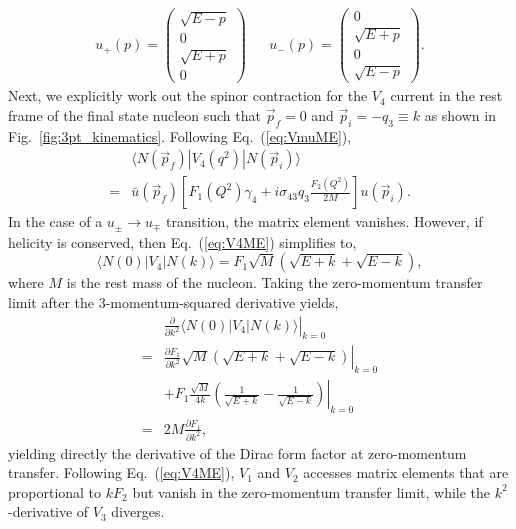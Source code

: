 \documentclass[prd,aps,twocolumn,superscriptaddress,tightenlines,nofootinbib,floatfix,preprintnumbers,10pt]{revtex4-1}
\begin{document}
\begin{align}
u_+(p)=\begin{pmatrix}
\sqrt{E-p}\\0\\ \sqrt{E+p}\\0
\end{pmatrix}
&&
u_-(p)=\begin{pmatrix}
0\\ \sqrt{E+p}\\0\\ \sqrt{E-p}
\end{pmatrix}.
\end{align}
Next, we explicitly work out the spinor contraction for the $V_4$ current in the rest frame of the final state nucleon such that $\vec{p}_f=0$ and $\vec{p}_i = -q_3\equiv k$ as shown in Fig.~\ref{fig:3pt_kinematics}. Following Eq.~(\ref{eq:VmuME}),
\begin{align}
&\langle N(\vec{p}_f) | V_4(q^2)|N(\vec{p}_i) \rangle\nonumber \\
= & \bar{u}(\vec{p}_f)\left[F_1(Q^2)\gamma_4 + i\sigma_{43}q_3\frac{F_2(Q^2)}{2M}\right]u(\vec{p}_i).
\label{eq:V4ME}
\end{align}
In the case of a $u_{\pm}\rightarrow u_{\mp}$ transition, the matrix element vanishes. However, if helicity is conserved, then Eq.~(\ref{eq:V4ME}) simplifies to,
\begin{equation}
\langle N(0) | V_4 | N(k) \rangle = F_1\sqrt{M}\left(\sqrt{E+k} + \sqrt{E-k}\right),
\end{equation}
where $M$ is the rest mass of the nucleon. Taking the zero-momentum transfer limit after the 3-momentum-squared derivative yields,
\begin{align}
&\left.\frac{\partial}{\partial k^2} \langle N(0) | V_4 | N(k) \rangle\right|_{k=0} \nonumber \\
= &\left.\frac{\partial F_1}{\partial k^2}\sqrt{M}\left(\sqrt{E+k} + \sqrt{E-k}\right)\right|_{k=0} \nonumber\\
& +\left.F_1\frac{\sqrt{M}}{4k}\left(\frac{1}{\sqrt{E+k}} -\frac{1}{\sqrt{E-k}}  \right)\right|_{k=0}\nonumber \\
= & 2M \frac{\partial F_1}{\partial k^2},
\end{align}
yielding directly the derivative of the Dirac form factor at zero-momentum transfer. Following Eq.~(\ref{eq:V4ME}), $V_1$ and $V_2$ accesses matrix elements that are proportional to $kF_2$ but vanish in the zero-momentum transfer limit, while the $k^2$-derivative of $V_3$ diverges.
\end{document}
